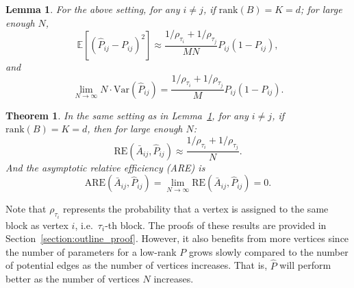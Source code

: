 \documentclass[journal,twoside,web]{ieeecolor}
\newtheorem{lemma}[fact]{Lemma}
\newtheorem{theorem}[fact]{Theorem}
\newcommand{\Ex}{\mathbb{E}}
\begin{document}
\begin{lemma}
\label{lm:VarPhat}
For the above setting, for any $i \ne j$, if $\mathrm{rank}(B)=K=d$; for large enough $N$,
\[
    \Ex[(\hat{P}_{ij} - P_{ij})^2] \approx
    \frac{1/\rho_{\tau_i} + 1/\rho_{\tau_j}}{M N} P_{ij}(1-P_{ij}),
\]
and
\[
    \lim_{N \to \infty} N \cdot \mathrm{Var}(\hat{P}_{ij}) =
    \frac{1/\rho_{\tau_i} + 1/\rho_{\tau_j}}{M} P_{ij} (1 - P_{ij}).
\]
\end{lemma}


\begin{theorem}
\label{thm:ARE}
In the same setting as in Lemma~\ref{lm:VarPhat}, for any $i \ne j$, if $\mathrm{rank}(B)=K=d$, then for large enough $N$:
\begin{equation}
	    \mathrm{RE}(\bar{A}_{ij}, \hat{P}_{ij}) \approx
    \frac{1/\rho_{\tau_i} + 1/\rho_{\tau_j}}{N}.
\label{eq:approx_re}
\end{equation}
And the asymptotic relative efficiency (ARE) is
\[
    \mathrm{ARE}(\bar{A}_{ij}, \hat{P}_{ij}) = \lim_{N \to \infty} \mathrm{RE}(\bar{A}_{ij}, \hat{P}_{ij}) = 0.
    \label{eq:sbm_are}
\]
\end{theorem}

Note that $\rho_{\tau_i}$ represents the probability that a vertex is assigned to the same block as vertex $i$, i.e.\ $\tau_i$-th block.
The proofs of these results are provided in Section~\ref{section:outline_proof}. 
However, it also benefits from more vertices since the number of parameters for a low-rank $P$ grows slowly compared to the number of potential edges as the number of vertices increases. That is, $\hat{P}$ will perform better as the number of vertices $N$ increases.

\end{document}
